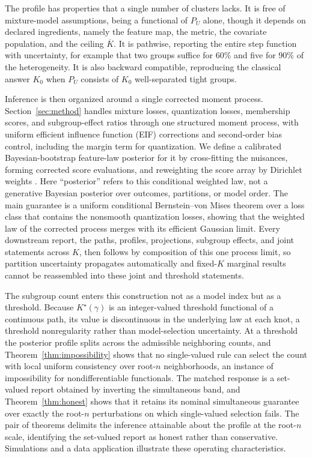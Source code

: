 \documentclass[11pt]{article}
\begin{document}
The profile has properties that a single number of clusters lacks. It is free of mixture-model assumptions, being a functional of $P_U$ alone, though it depends on declared ingredients, namely the feature map, the metric, the covariate population, and the ceiling $\overline K$. It is pathwise, reporting the entire step function with uncertainty, for example that two groups suffice for 60\% and five for 90\% of the heterogeneity. It is also backward compatible, reproducing the classical answer $K_0$ when $P_U$ consists of $K_0$ well-separated tight groups.

Inference is then organized around a single corrected moment process. Section~\ref{sec:method} handles mixture losses, quantization losses, membership scores, and subgroup-effect ratios through one structured moment process, with uniform efficient influence function (EIF) corrections and second-order bias control, including the margin term for quantization. We define a calibrated Bayesian-bootstrap feature-law posterior for it by cross-fitting the nuisances, forming corrected score evaluations, and reweighting the score array by Dirichlet weights \citep{rubin1981}. Here ``posterior'' refers to this conditional weighted law, not a generative Bayesian posterior over outcomes, partitions, or model order. The main guarantee is a uniform conditional Bernstein--von Mises theorem over a loss class that contains the nonsmooth quantization losses, showing that the weighted law of the corrected process merges with its efficient Gaussian limit. Every downstream report, the paths, profiles, projections, subgroup effects, and joint statements across $K$, then follows by composition of this one process limit, so partition uncertainty propagates automatically and fixed-$K$ marginal results cannot be reassembled into these joint and threshold statements.

The subgroup count enters this construction not as a model index but as a threshold. Because $K^\star(\gamma)$ is an integer-valued threshold functional of a continuous path, its value is discontinuous in the underlying law at each knot, a threshold nonregularity rather than model-selection uncertainty. At a threshold the posterior profile splits across the admissible neighboring counts, and Theorem~\ref{thm:impossibility} shows that no single-valued rule can select the count with local uniform consistency over root-$n$ neighborhoods, an instance of impossibility for nondifferentiable functionals. The matched response is a set-valued report obtained by inverting the simultaneous band, and Theorem~\ref{thm:honest} shows that it retains its nominal simultaneous guarantee over exactly the root-$n$ perturbations on which single-valued selection fails. The pair of theorems delimits the inference attainable about the profile at the root-$n$ scale, identifying the set-valued report as honest rather than conservative. Simulations and a data application illustrate these operating characteristics.
\end{document}
